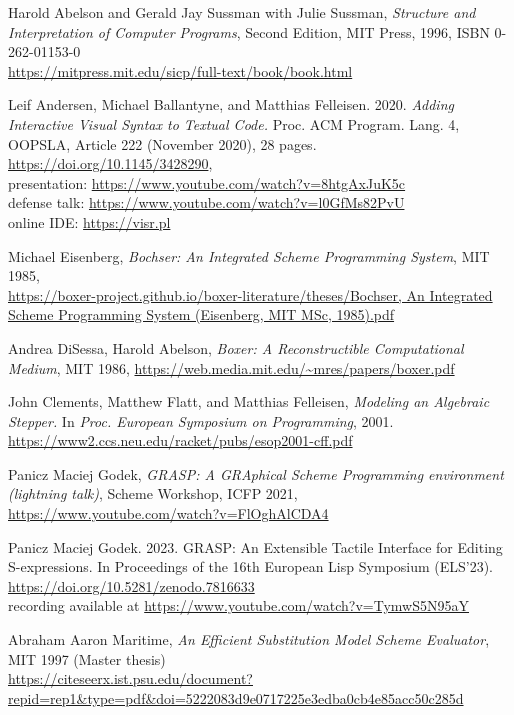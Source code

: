 \documentclass[acmsmall]{acmart}
\begin{document}
\begin{thebibliography}{12}

  Harold Abelson and Gerald Jay Sussman with Julie Sussman,
  \emph{Structure and Interpretation of Computer Programs},
  Second Edition, MIT Press, 1996, ISBN 0-262-01153-0 \\
  \url{https://mitpress.mit.edu/sicp/full-text/book/book.html}
  
 Leif Andersen, Michael Ballantyne, and Matthias
  Felleisen. 2020. \emph{Adding Interactive Visual Syntax to Textual
  Code.} Proc. ACM Program. Lang. 4, OOPSLA, Article 222 (November
  2020), 28 pages. \url{https://doi.org/10.1145/3428290}, \\
  presentation: \url{https://www.youtube.com/watch?v=8htgAxJuK5c} \\ 
  defense talk: \url{https://www.youtube.com/watch?v=l0GfMs82PvU} \\
  online IDE: \url{https://visr.pl}

Michael Eisenberg, \emph{Bochser: An Integrated Scheme Programming System},
  MIT 1985, \\
  \url{https://boxer-project.github.io/boxer-literature/theses/Bochser, An Integrated Scheme Programming System (Eisenberg, MIT MSc, 1985).pdf}
  
  Andrea DiSessa, Harold Abelson,
  \emph{Boxer: A Reconstructible Computational Medium},
  MIT 1986, \url{https://web.media.mit.edu/~mres/papers/boxer.pdf}

  John Clements, Matthew Flatt, and Matthias Felleisen,
  \emph{Modeling an Algebraic Stepper.} In \emph{Proc. European
  Symposium on Programming}, 2001. \\
  \url{https://www2.ccs.neu.edu/racket/pubs/esop2001-cff.pdf}
  
 Panicz Maciej Godek, \emph{GRASP: A GRAphical
Scheme Programming environment (lightning talk)}, Scheme Workshop,
  ICFP 2021, \url{https://www.youtube.com/watch?v=FlOghAlCDA4}

 Panicz Maciej Godek. 2023. GRASP: An Extensible
  Tactile Interface for Editing S-expressions. In Proceedings of the
  16th European Lisp Symposium (ELS’23). 
  \url{https://doi.org/10.5281/zenodo.7816633} \\ recording
  available at \url{https://www.youtube.com/watch?v=TymwS5N95aY}

 Abraham Aaron Maritime, \emph{An Efficient
Substitution Model Scheme Evaluator}, MIT 1997 (Master thesis)\\
  \url{https://citeseerx.ist.psu.edu/document?repid=rep1&type=pdf&doi=5222083d9e0717225e3edba0cb4e85acc50c285d}


\end{thebibliography}
\end{document}
